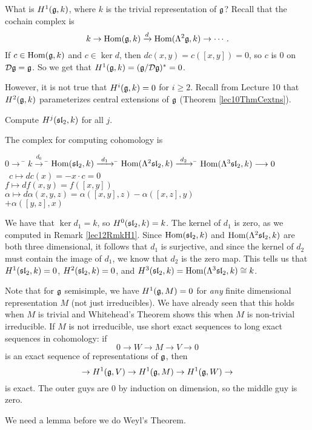  \begin{remark}\label{lec12RmkH1}
   What is $H^1(\g,k)$, where $k$ is the trivial representation of $\g$? Recall that
   the cochain complex is
   \[
      k\to \hom(\g,k) \xrightarrow{d} \hom(\Lambda^2 \g,k) \to \cdots.
   \]
  If $c \in \hom(\g,k)$ and $c \in \ker d$, then $dc(x,y) = c([x,y])=0$, so $c$ is 0 on
  $\D\g=\g$. So we get that $H^1(\g,k) = (\g/\D\g)^* = 0$.

  However, it is not true that $H^i(\g,k)=0$ for $i\ge 2$. Recall from Lecture 10 that
  $H^2(\g,k)$ parameterizes central extensions of $\g$ (Theorem \ref{lec10ThmCextns}).
 \end{remark}
 \begin{exercise}
   Compute $H^j(\sl_2,k)$ for all $j$.
   \begin{solution}
     The complex for computing cohomology is
     \begin{tabbing}
           $0\longrightarrow $
        \= $k \xrightarrow{\ d_0\ }$
        \= $\hom(\sl_2,k) \xrightarrow{\ d_1\ }$
        \= $\hom(\Lambda^2\sl_2,k) \xrightarrow{\ d_2\ }$
        \= $\hom(\Lambda^3 \sl_2,k) \longrightarrow 0$ \\
        \> \ $c\longmapsto dc(x)=-x\cdot c=0$ \\
        \> \>\qquad $f\longmapsto df(x,y)=f([x,y])$\\
        \> \> \> $\alpha\mapsto
        d\alpha(x,y,z)=\alpha([x,y],z)-\alpha([x,z],y)$\\ \>\>\>\> $+\alpha([y,z],x)$
     \end{tabbing}
     We have that $\ker d_1=k$, so $H^0(\sl_2,k)=k$. The kernel of $d_1$ is zero, as
     we computed in Remark \ref{lec12RmkH1}. Since $\hom(\sl_2,k)$ and
     $\hom(\Lambda^2\sl_2,k)$ are both three dimensional, it follows that $d_1$ is
     surjective, and since the kernel of $d_2$ must contain the image of $d_1$, we
     know that $d_2$ is the zero map. This tells us that $H^1(\sl_2,k)=0$,
     $H^2(\sl_2,k)=0$, and $H^3(\sl_2,k)=\hom(\Lambda^3\sl_2,k)\cong k$.
   \end{solution}
 \end{exercise}
 \begin{remark}\label{lec12rmkH1}
 Note that for $\g$ semisimple, we have $H^1(\g,M)=0$ for \emph{any} finite
 dimensional representation $M$ (not just irreducibles). We have already seen that
 this holds when $M$ is trivial and Whitehead's Theorem shows this when $M$ is
 non-trivial irreducible. If $M$ is not irreducible, use short exact sequences to long
 exact sequences in cohomology: if
 \[
    0\to W\to M\to V\to 0
 \]
 is an exact sequence of representations of $\g$, then
 \[
    \to H^1(\g,V)\to H^1(\g,M) \to H^1(\g,W)\to
 \]
 is exact.  The outer guys are 0 by induction on dimension,
 so the middle guy is zero.
 \end{remark}
 We need a lemma before we do Weyl's Theorem.


